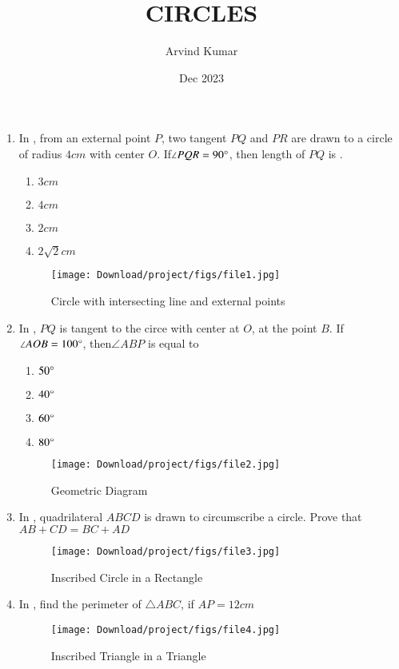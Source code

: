 \documentclass[12pt,-letter paper]{article}
\title{CIRCLES}
\author{Arvind Kumar}
\date{Dec 2023}
\begin{document}
\maketitle
\begin{enumerate}
\item In , from an external point $P$, two tangent $PQ$ and $PR$ are drawn to a circle of radius $4cm$ with center $O$. If$\angle{PQR}=90\degree$, then length of $PQ$ is \underline {\hspace{4cm}}.
\begin{enumerate}[label=(\alph*)]
\item $3cm$ 
\item $4cm$
\item $2cm$
\item $2{\sqrt{2}}cm$ 
\end{enumerate}
\begin{figure}[H]
\centering
\texttt{[image: Download/project/figs/file1.jpg]}
\caption{Circle with intersecting line and external points}
\label{fig:Figure1}
\end{figure}
\item In , $PQ$ is tangent to the circe with center at $O$, at the point $B$. If$\angle AOB=100\degree$, then$\angle ABP$ is equal to\newline
\begin{enumerate}[label=(\alph*)] 
\item $50\degree$ 
\item $40\degree$ 
\item $60\degree$ 
\item $80\degree$
\end{enumerate}
\begin{figure}[H]
\centering
\texttt{[image: Download/project/figs/file2.jpg]}
\caption{Geometric Diagram}
\label{fig:Figure2}
\end{figure}
\item In , quadrilateral $ABCD$ is drawn to circumscribe a circle. Prove that\newline
$AB+CD=BC+AD$
\begin{figure}[H]
\centering
\texttt{[image: Download/project/figs/file3.jpg]}
\caption{Inscribed Circle in a Rectangle}
\label{fig:Figure3}
\end{figure}
\item In , find the perimeter of $\triangle ABC$, if $AP=12cm$
\begin{figure}[H]
\centering
\texttt{[image: Download/project/figs/file4.jpg]}
\caption{Inscribed Triangle in a Triangle}                                                   
\label{fig:Figure4}
\end{figure}
\end{enumerate}
\end{document}
